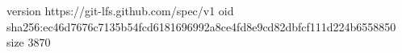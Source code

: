 version https://git-lfs.github.com/spec/v1
oid sha256:ec46d7676c7135b54fcd6181696992a8ce4fd8e9cd82dbfcf111d224b6558850
size 3870
